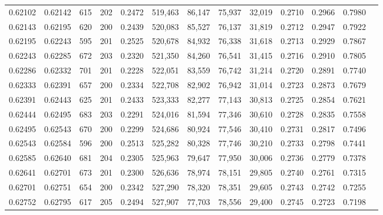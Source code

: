 \begin{tabular}{rrrrrrrrrrrrr}
0.62102 & 0.62142 &   615 & 202 &                                     0.2472 & 519,463 &  86,147 &  75,937 &  32,019 & 0.2710 & 0.2966 & 0.7980 \\
0.62143 & 0.62195 &   620 & 200 &                                     0.2439 & 520,083 &  85,527 &  76,137 &  31,819 & 0.2712 & 0.2947 & 0.7922 \\
0.62195 & 0.62243 &   595 & 201 &                                     0.2525 & 520,678 &  84,932 &  76,338 &  31,618 & 0.2713 & 0.2929 & 0.7867 \\
0.62243 & 0.62285 &   672 & 203 &                                     0.2320 & 521,350 &  84,260 &  76,541 &  31,415 & 0.2716 & 0.2910 & 0.7805 \\
0.62286 & 0.62332 &   701 & 201 &                                     0.2228 & 522,051 &  83,559 &  76,742 &  31,214 & 0.2720 & 0.2891 & 0.7740 \\
0.62333 & 0.62391 &   657 & 200 &                                     0.2334 & 522,708 &  82,902 &  76,942 &  31,014 & 0.2723 & 0.2873 & 0.7679 \\
0.62391 & 0.62443 &   625 & 201 &                                     0.2433 & 523,333 &  82,277 &  77,143 &  30,813 & 0.2725 & 0.2854 & 0.7621 \\
0.62444 & 0.62495 &   683 & 203 &                                     0.2291 & 524,016 &  81,594 &  77,346 &  30,610 & 0.2728 & 0.2835 & 0.7558 \\
0.62495 & 0.62543 &   670 & 200 &                                     0.2299 & 524,686 &  80,924 &  77,546 &  30,410 & 0.2731 & 0.2817 & 0.7496 \\
0.62543 & 0.62584 &   596 & 200 &                                     0.2513 & 525,282 &  80,328 &  77,746 &  30,210 & 0.2733 & 0.2798 & 0.7441 \\
0.62585 & 0.62640 &   681 & 204 &                                     0.2305 & 525,963 &  79,647 &  77,950 &  30,006 & 0.2736 & 0.2779 & 0.7378 \\
0.62641 & 0.62701 &   673 & 201 &                                     0.2300 & 526,636 &  78,974 &  78,151 &  29,805 & 0.2740 & 0.2761 & 0.7315 \\
0.62701 & 0.62751 &   654 & 200 &                                     0.2342 & 527,290 &  78,320 &  78,351 &  29,605 & 0.2743 & 0.2742 & 0.7255 \\
0.62752 & 0.62795 &   617 & 205 &                                     0.2494 & 527,907 &  77,703 &  78,556 &  29,400 & 0.2745 & 0.2723 & 0.7198 \\

\end{tabular}
